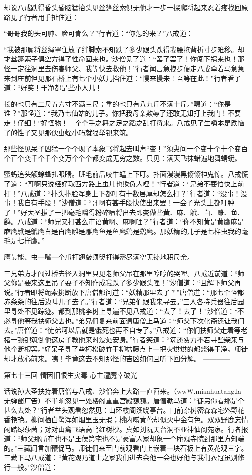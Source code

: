 \documentclass[12pt,UTF8]{ctexbook}
\begin{document}
却说八戒跌得昏头昏脑猛抬头见丝篷丝索俱无他才一步一探爬将起来忍着疼找回原路见了行者用手扯住道：

“哥哥我的头可肿、脸可青么？”行者道：“你怎的来？”八戒道：

“我被那厮将丝绳罩住放了绊脚索不知跌了多少跟头跌得我腰拖背折寸步难移。却才丝篷索子俱空方得了性命回来也。”沙僧见了道：“罢了罢了！你闯下祸来也！那怪一定往洞里去伤害师父、我等快去救他！”行者闻言急拽步便走八戒牵着马急急来到庄前但见那石桥上有七个小妖儿挡住道：“慢来慢来！吾等在此！”行者看了道：“好笑！干净都是些小人儿！

长的也只有二尺五六寸不满三尺；重的也只有八九斤不满十斤。”喝道：“你是谁？”那怪道：“我乃七仙姑的儿子。你把我母亲欺辱了还敢无知打上我门！不要走！仔细！”好怪物！一个个手之舞之足之蹈之乱打将来。八戒见了生嗔本是跌恼了的性子又见那伙虫蛭小巧就狠举钯来筑。

那些怪见呆子凶猛一个个现了本象飞将起去叫声“变！”须臾间一个变十个十个变百个百个变千个千个变万个个个都变成无穷之数。只见：满天飞抹蜡遍地舞蜻蜓。

蜜蚂追头额蜍蜂扎眼睛。班毛前后咬牛蜢上下叮。扑面漫漫黑翛翛神鬼惊。八戒慌了道：“哥啊只说经好取西方路上虫儿也欺负人哩！”行者道：“兄弟不要怕快上前打！”八戒道：“扑头扑脸浑身上下都叮有十数层厚却怎么打？”行者道：“没事！没事！我自有手段！”沙僧道：“哥啊有甚手段快使出来罢！一会子光头上都叮肿了！”好大圣拔了一把毫毛嚼得粉碎喷将出去即变做些黄、麻、鴏、白、雕、鱼、鹞。八戒道：“师兄又打甚么市语黄啊、麻啊哩？”行者道：“你不知黄是黄鹰麻是麻鹰鴏是鴏鹰白是白鹰雕是雕鹰鱼是鱼鹰鹞是鹞鹰。那妖精的儿子是七样虫我的毫毛是七样鹰。”

鹰最能、虫一嘴一个爪打翅敲须臾打得罄尽满空无迹地积尺余。

三兄弟方才闯过桥去径入洞里只见老师父吊在那里哼哼的哭哩。八戒近前道：“师父你是要来这里吊了耍子不知作成我跌了多少跟头哩！”沙僧道：“且解下师父再说。”行者即将绳索挑断放下唐僧都问道：“妖精那里去了？”唐僧道：“那七个怪都赤条条的往后边叫儿子去了。”行者道：“兄弟们跟我来寻去。”三人各持兵器往后园里寻处不见踪迹。都到那桃李树上寻遍不见八戒道：“去了！去了！”沙僧道：“不必寻他等我扶师父去也。”弟兄们复来前面请唐僧上马道：“师父下次化斋还让我们去。”唐僧道：“徒弟呵以后就是饿死也再不自专了。”八戒道：“你们扶师父走着等老猪一顿钯筑倒他这房子教他来时没处安身。”行者笑道：“筑还费力不若寻些柴来与他个断根罢。”好呆子寻了些朽松破竹干柳枯藤点上一把火烘烘的都烧得干净。师徒却才放心前来。咦！毕竟这去不知那怪的吉凶如何且听下回分解。
------------

第七十三回 情因旧恨生灾毒 心主遭魔幸破光

话说孙大圣扶持着唐僧与八戒、沙僧奔上大路一直西来。（wwW.mianhuatang.la 无弹窗广告）不半晌忽见一处楼阁重重宫殿巍巍。唐僧勒马道：“徒弟你看那是个甚么去处？”行者举头观看忽然见：山环楼阁溪绕亭台。门前杂树密森森宅外野花香艳艳。柳间栖白鹭浑如烟里玉无瑕；桃内啭黄莺却似火中金有色。双双野鹿忘情闲踏绿莎茵；对对山禽飞语高鸣红树杪。真如刘阮天台洞不亚神仙阆苑家。行者报道：“师父那所在也不是王侯第宅也不是豪富人家却象一个庵观寺院到那里方知端的。”三藏闻言加鞭促马。师徒们来至门前观看门上嵌着一块石板上有黄花观三字。三藏下马八戒道：“黄花观乃道士之家我们进去会他一会也好他与我们衣冠虽别修行一般。”沙僧道：
\end{document}
